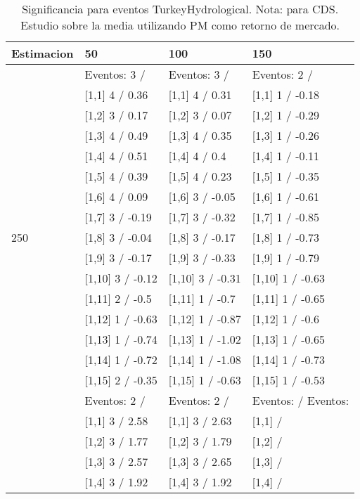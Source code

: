 \begin{table}

\caption{Significancia para eventos TurkeyHydrological. Nota: para CDS. Estudio sobre la media utilizando PM como retorno de mercado.}
\centering
\begin{tabular}[t]{llll}
\toprule
Estimacion & 50 & 100 & 150\\
\midrule
 & Eventos:  3 / & Eventos:  3 / & Eventos:  2 /\\
 & {}[1,1] 4  / 0.36 & {}[1,1] 4  / 0.31 & {}[1,1] 1  / -0.18\\
 & {}[1,2] 3  / 0.17 & {}[1,2] 3  / 0.07 & {}[1,2] 1  / -0.29\\
 & {}[1,3] 4  / 0.49 & {}[1,3] 4  / 0.35 & {}[1,3] 1  / -0.26\\
 & {}[1,4] 4  / 0.51 & {}[1,4] 4  / 0.4 & {}[1,4] 1  / -0.11\\
\addlinespace
 & {}[1,5] 4  / 0.39 & {}[1,5] 4  / 0.23 & {}[1,5] 1  / -0.35\\
 & {}[1,6] 4  / 0.09 & {}[1,6] 3  / -0.05 & {}[1,6] 1  / -0.61\\
 & {}[1,7] 3  / -0.19 & {}[1,7] 3  / -0.32 & {}[1,7] 1  / -0.85\\
250 & {}[1,8] 3  / -0.04 & {}[1,8] 3  / -0.17 & {}[1,8] 1  / -0.73\\
 & {}[1,9] 3  / -0.17 & {}[1,9] 3  / -0.33 & {}[1,9] 1  / -0.79\\
\addlinespace
 & {}[1,10] 3  / -0.12 & {}[1,10] 3  / -0.31 & {}[1,10] 1  / -0.63\\
 & {}[1,11] 2  / -0.5 & {}[1,11] 1  / -0.7 & {}[1,11] 1  / -0.65\\
 & {}[1,12] 1  / -0.63 & {}[1,12] 1  / -0.87 & {}[1,12] 1  / -0.6\\
 & {}[1,13] 1  / -0.74 & {}[1,13] 1  / -1.02 & {}[1,13] 1  / -0.65\\
 & {}[1,14] 1  / -0.72 & {}[1,14] 1  / -1.08 & {}[1,14] 1  / -0.73\\
\addlinespace
 & {}[1,15] 2  / -0.35 & {}[1,15] 1  / -0.63 & {}[1,15] 1  / -0.53\\
 & Eventos:  2 / & Eventos:  2 / & Eventos:   / Eventos:\\
 & {}[1,1] 3  / 2.58 & {}[1,1] 3  / 2.63 & {}[1,1]  /\\
 & {}[1,2] 3  / 1.77 & {}[1,2] 3  / 1.79 & {}[1,2]  /\\
 & {}[1,3] 3  / 2.57 & {}[1,3] 3  / 2.65 & {}[1,3]  /\\
\addlinespace
 & {}[1,4] 3  / 1.92 & {}[1,4] 3  / 1.92 & {}[1,4]  /\\

\end{tabular}
\end{table}
